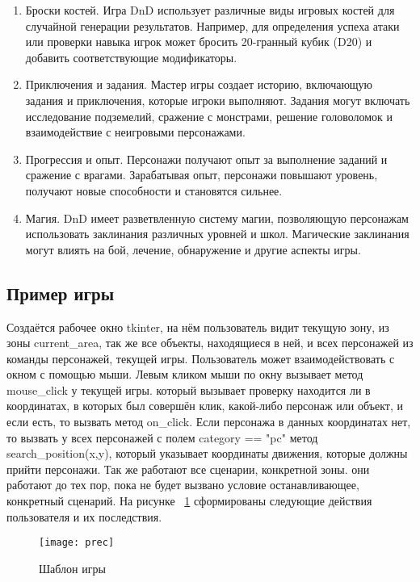\begin{enumerate}
		\item Броски костей.
			 Игра DnD использует различные виды игровых костей для случайной генерации результатов. Например, для определения успеха атаки или проверки навыка игрок может бросить 20-гранный кубик (D20) и добавить соответствующие модификаторы.
		\item Приключения и задания.
			 Мастер игры создает историю, включающую задания и приключения, которые игроки выполняют. Задания могут включать исследование подземелий, сражение с монстрами, решение головоломок и взаимодействие с неигровыми персонажами.
		\item Прогрессия и опыт.
			Персонажи получают опыт за выполнение заданий и сражение с врагами. Зарабатывая опыт, персонажи повышают уровень, получают новые способности и становятся сильнее.
		\item Магия.
			DnD имеет разветвленную систему магии, позволяющую персонажам использовать заклинания различных уровней и школ. Магические заклинания могут влиять на бой, лечение, обнаружение и другие аспекты игры.
	\end{enumerate}
\subsection{Пример игры}
Создаётся рабочее окно tkinter, на нём пользователь видит текущую зону, из зоны current\_area, так же все объекты, находящиеся в ней, и всех персонажей из команды персонажей, текущей игры. Пользователь может взаимодействовать с окном с помощью мыши. Левым кликом мыши по окну вызывает метод mouse\_click у текущей игры. который вызывает проверку находится ли в координатах, в которых был совершён клик, какой-либо персонаж или объект, и если есть, то вызвать метод on\_click. Если персонажа в данных координатах нет, то вызвать у всех персонажей с полем category == "pc" метод search\_position(x,y), который указывает координаты движения, которые должны прийти персонажи. Так же работают все сценарии, конкретной зоны. они работают до тех пор, пока не будет вызвано условие останавливающее, конкретный сценарий.
На рисунке ~\ref{prec:image} сформированы следующие действия пользователя и их последствия.
\begin{figure}[H]
	\texttt{[image: prec]}
	\caption{Шаблон игры}
	\label{prec:image}
\end{figure}

